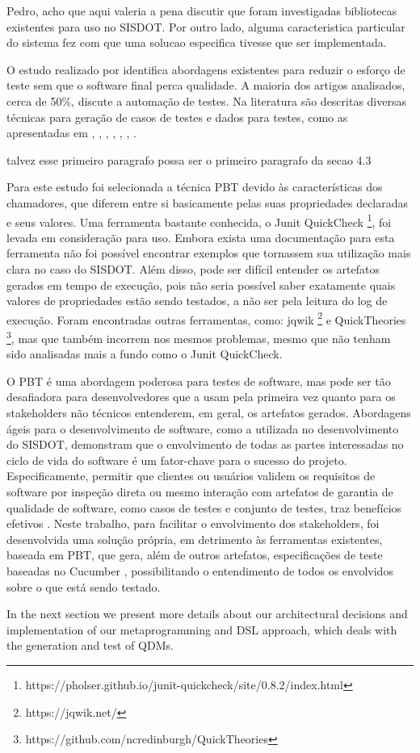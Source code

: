 {\color{red}Pedro, acho que aqui valeria a pena discutir que
  foram investigadas bibliotecas existentes para uso no SISDOT. Por outro
  lado, alguma caracteristica particular do sistema fez com que uma
  solucao especifica tivesse que ser implementada.}
  
O estudo realizado por \cite{elberzhager2012} identifica abordagens existentes para reduzir o esforço de teste sem que o software final perca qualidade. A maioria dos artigos analisados, cerca de 50\%, discute a automação de testes. Na literatura são descritas diversas técnicas para geração de casos de testes e dados para testes, como as apresentadas em \cite{hooda2014}, \cite{mahadik2016}, \cite{elghondakly2016}, \cite{ali2010}, \cite{harman2010}, \cite{sahoo2016}, \cite{khurana2017}.

{\color{red}talvez esse primeiro paragrafo possa ser o primeiro paragrafo da secao 4.3}

Para este estudo foi selecionada a técnica PBT devido às características dos chamadores, que diferem entre si basicamente pelas suas propriedades declaradas e seus valores. Uma ferramenta bastante conhecida, o Junit QuickCheck \footnote{https://pholser.github.io/junit-quickcheck/site/0.8.2/index.html}, foi levada em consideração para uso. Embora exista uma documentação para esta ferramenta não foi possível encontrar exemplos que tornassem sua utilização mais clara no caso do SISDOT. Além disso, pode ser difícil entender os artefatos gerados em tempo de execução{\color{red}, pois não seria possível saber exatamente quais valores de propriedades estão sendo testados, a não ser pela leitura do log de execução.} Foram encontradas outras ferramentas, como: jqwik \footnote{https://jqwik.net/} e QuickTheories \footnote{https://github.com/ncredinburgh/QuickTheories}, mas que também incorrem nos mesmos problemas, mesmo que não tenham sido analisadas mais a fundo como o Junit QuickCheck.

O PBT é uma abordagem poderosa para testes de software, mas pode ser tão desafiadora para desenvolvedores que a usam pela primeira vez quanto para os stakeholders não técnicos entenderem, em geral, os artefatos gerados. Abordagens ágeis para o desenvolvimento de software, como a utilizada no desenvolvimento do SISDOT, demonstram que o envolvimento de todas as partes interessadas no ciclo de vida do software é um fator-chave para o sucesso do projeto. Especificamente, permitir que clientes ou usuários validem os requisitos de software por inspeção direta ou mesmo interação com artefatos de garantia de qualidade de software, como casos de testes e conjunto de testes, traz benefícios efetivos \cite{castro2016}. Neste trabalho, para facilitar o envolvimento dos stakeholders, foi desenvolvida uma solução própria, em detrimento às ferramentas existentes, baseada em PBT, que gera, além de outros artefatos, especificações de teste baseadas no Cucumber \cite{wynne2017}, possibilitando o entendimento de todos os envolvidos sobre o que está sendo testado.



{\color{red}In the next section we present more details about our architectural decisions and implementation of our metaprogramming and DSL approach, which deals with the generation and test of QDMs.}

